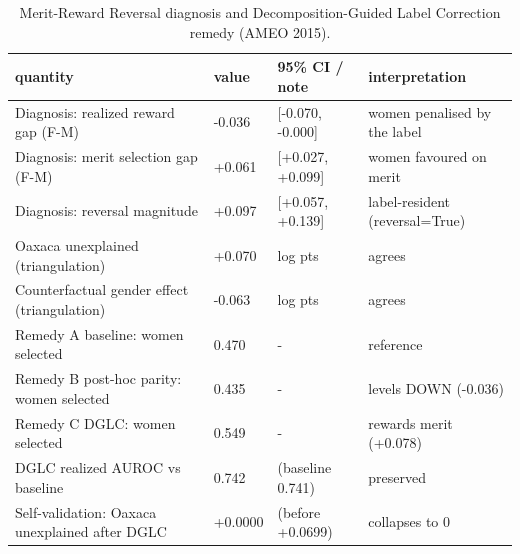 \begin{table}
\caption{Merit-Reward Reversal diagnosis and Decomposition-Guided Label Correction remedy (AMEO 2015).}
\label{tab:dglc_master}
\begin{tabular}{llll}
\toprule
quantity & value & 95\% CI / note & interpretation \\
\midrule
Diagnosis: realized reward gap (F-M) & -0.036 & [-0.070, -0.000] & women penalised by the label \\
Diagnosis: merit selection gap (F-M) & +0.061 & [+0.027, +0.099] & women favoured on merit \\
Diagnosis: reversal magnitude & +0.097 & [+0.057, +0.139] & label-resident (reversal=True) \\
Oaxaca unexplained (triangulation) & +0.070 & log pts & agrees \\
Counterfactual gender effect (triangulation) & -0.063 & log pts & agrees \\
Remedy A baseline: women selected & 0.470 & - & reference \\
Remedy B post-hoc parity: women selected & 0.435 & - & levels DOWN (-0.036) \\
Remedy C DGLC: women selected & 0.549 & - & rewards merit (+0.078) \\
DGLC realized AUROC vs baseline & 0.742 & (baseline 0.741) & preserved \\
Self-validation: Oaxaca unexplained after DGLC & +0.0000 & (before +0.0699) & collapses to 0 \\
\bottomrule
\end{tabular}
\end{table}
